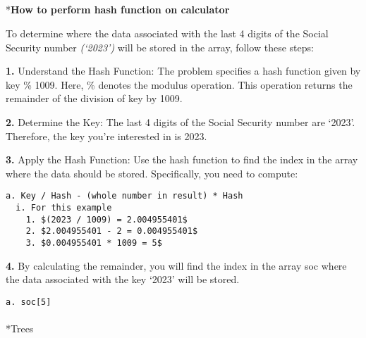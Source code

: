 \documentclass[
  letterpaper,
  DIV=11,
  numbers=noendperiod]{scrreprt}
\makeatletter
\let\oldparagraph\paragraph
\renewcommand{\paragraph}{
    \@ifstar
      \xxxParagraphStar
      \xxxParagraphNoStar
  }
\newcommand{\xxxParagraphStar}[1]{\oldparagraph*{#1}\mbox{}}
\newcommand{\xxxParagraphNoStar}[1]{\oldparagraph{#1}\mbox{}}
\let\oldsubparagraph\subparagraph
\renewcommand{\subparagraph}{
    \@ifstar
      \xxxSubParagraphStar
      \xxxSubParagraphNoStar
  }
\newcommand{\xxxSubParagraphStar}[1]{\oldsubparagraph*{#1}\mbox{}}
\newcommand{\xxxSubParagraphNoStar}[1]{\oldsubparagraph{#1}\mbox{}}
\makeatother
\begin{document}
\begin{tcolorbox}[enhanced jigsaw, colframe=quarto-callout-note-color-frame, toprule=.15mm, bottomrule=.15mm, rightrule=.15mm, colback=white, breakable, arc=.35mm, opacityback=0, left=2mm, leftrule=.75mm]
\subparagraph*{\texorpdfstring{\textbf{How to perform hash function on
calculator}}{How to perform hash function on calculator}}\label{how-to-perform-hash-function-on-calculator}

To determine where the data associated with the last 4 digits of the
Social Security number \emph{(`2023')} will be stored in the array,
follow these steps:

\textbf{1.} Understand the Hash Function: The problem specifies a hash
function given by key \% 1009. Here, \% denotes the modulus operation.
This operation returns the remainder of the division of key by 1009.

\textbf{2.} Determine the Key: The last 4 digits of the Social Security
number are `2023'. Therefore, the key you're interested in is 2023.

\textbf{3.} Apply the Hash Function: Use the hash function to find the
index in the array where the data should be stored. Specifically, you
need to compute:

\begin{verbatim}
a. Key / Hash - (whole number in result) * Hash
  i. For this example
    1. $(2023 / 1009) = 2.004955401$
    2. $2.004955401 - 2 = 0.004955401$
    3. $0.004955401 * 1009 = 5$
\end{verbatim}

\textbf{4.} By calculating the remainder, you will find the index in the
array soc where the data associated with the key `2023' will be stored.

\begin{verbatim}
a. soc[5]
\end{verbatim}

\end{tcolorbox}

\paragraph*{Trees}\label{trees}
\end{document}

